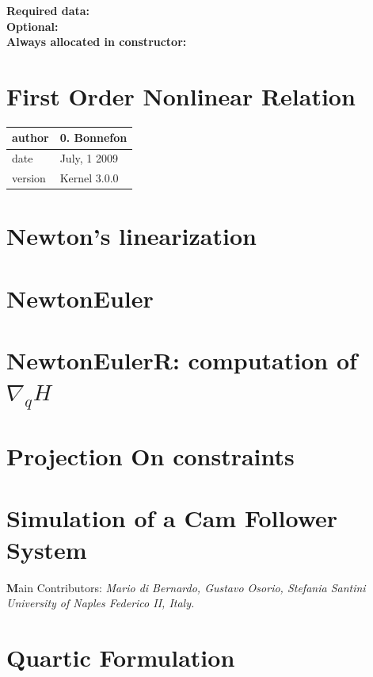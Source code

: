 \documentclass[10pt]{report}
\begin{document}
\textbf{Required data:}\\

\textbf{Optional:}\\

\textbf{Always allocated in constructor:} \\

\chapter{First Order Nonlinear Relation }

\begin{table}[!ht]
  \begin{tabular}{|l|l|}
    \hline
    author  & 0. Bonnefon \\
    \hline
    date    & July, 1 2009 \\ 
    \hline
    version & Kernel 3.0.0 \\
    \hline
  \end{tabular}
\end{table}

\chapter{Newton's linearization}


\chapter{NewtonEuler}

\chapter{NewtonEulerR: computation of $\nabla _qH$}

\chapter{Projection On constraints}


%  


\chapter{Simulation of a Cam Follower System}
{\textbf Main Contributors:} {\textit{Mario di Bernardo, Gustavo Osorio, Stefania Santini}}\\
\textit{University of Naples Federico II, Italy.}\\


\chapter{Quartic Formulation}

\end{document}
